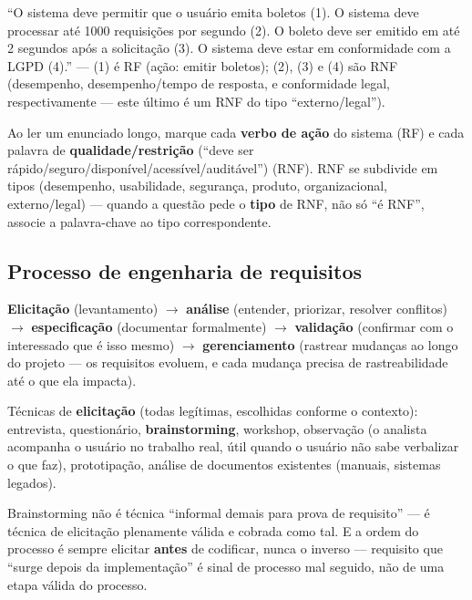 \begin{exemplo}
“O sistema deve permitir que o usuário emita boletos (1). O sistema deve
processar até 1000 requisições por segundo (2). O boleto deve ser emitido
em até 2 segundos após a solicitação (3). O sistema deve estar em
conformidade com a LGPD (4).” --- (1) é RF (ação: emitir boletos); (2), (3)
e (4) são RNF (desempenho, desempenho/tempo de resposta, e conformidade
legal, respectivamente --- este último é um RNF do tipo “externo/legal”).
\end{exemplo}

\begin{regrapratica}
Ao ler um enunciado longo, marque cada \textbf{verbo de ação} do sistema
(RF) e cada palavra de \textbf{qualidade/restrição} (“deve ser
rápido/seguro/disponível/acessível/auditável”) (RNF). RNF se subdivide em
tipos (desempenho, usabilidade, segurança, produto, organizacional,
externo/legal) --- quando a questão pede o \textbf{tipo} de RNF, não só
“é RNF”, associe a palavra-chave ao tipo correspondente.
\end{regrapratica}

\subsection{Processo de engenharia de requisitos}

\begin{conceito}
\textbf{Elicitação} (levantamento) $\to$ \textbf{análise} (entender,
priorizar, resolver conflitos) $\to$ \textbf{especificação} (documentar
formalmente) $\to$ \textbf{validação} (confirmar com o interessado que é
isso mesmo) $\to$ \textbf{gerenciamento} (rastrear mudanças ao longo do
projeto --- os requisitos evoluem, e cada mudança precisa de rastreabilidade
até o que ela impacta).

Técnicas de \textbf{elicitação} (todas legítimas, escolhidas conforme o
contexto): entrevista, questionário, \textbf{brainstorming}, workshop,
observação (o analista acompanha o usuário no trabalho real, útil quando o
usuário não sabe verbalizar o que faz), prototipação, análise de documentos
existentes (manuais, sistemas legados).
\end{conceito}

\begin{cuidado}
Brainstorming não é técnica “informal demais para prova de requisito” ---
é técnica de elicitação plenamente válida e cobrada como tal. E a ordem do
processo é sempre elicitar \textbf{antes} de codificar, nunca o inverso ---
requisito que “surge depois da implementação” é sinal de processo mal
seguido, não de uma etapa válida do processo.
\end{cuidado}

